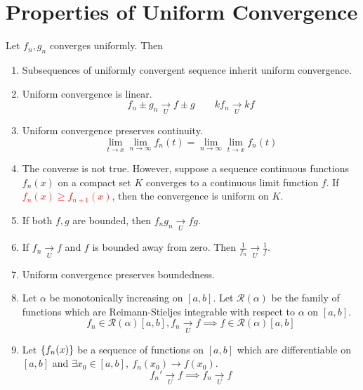 \section{Properties of Uniform Convergence}
		Let $f_n,g_n$ converges uniformly. Then
\begin{enumerate}
	\item Subsequences of uniformly convergent sequence inherit uniform convergence.
	\item Uniform convergence is linear.
	$$f_n \pm g_n \underset{U}\to f \pm g \qquad kf_n \underset{U}{\to} kf$$
	\item Uniform convergence preserves continuity.
	$$\lim_{t \to x} \lim_{n \to \infty} f_n(t) = \lim_{n \to \infty} \lim_{t \to x} f_n(t)$$
\item The converse is not true. However, suppose a sequence continuous functions $f_n(x)$ on a compact set $K$ converges to a continuous limit function $f$. If \textcolor{red}{$f_n(x) \ge f_{n+1}(x)$}, then the convergence is uniform on $K$.%
	\item If both $f,g$ are bounded, then $f_ng_n \underset{U}{\to} fg$.
	\item If $f_n \underset{U}{\to} f$ and $f$ is bounded away from zero. Then $\frac{1}{f_n} \underset{U}{\to} \frac{1}{f}$.
	\item Uniform convergence preserves boundedness.
	\item Let $\alpha$ be monotonically increasing on $[a,b]$. Let $\mathscr{R}(\alpha)$ be the family of functions which are Reimann-Stieljes integrable with respect to $\alpha$ on $[a,b]$.
	$$f_n \in \mathscr{R}(\alpha)[a,b], f_n \underset{U}{\to} f \implies f \in \mathscr{R}(\alpha)[a,b]$$
	\item Let $\{f_n(x)\}$ be a sequence of functions on $[a,b]$ which are differentiable on $[a,b]$ and $\exists x_0 \in [a,b],\ f_n(x_0) \to f(x_0)$.
	$$f_n' \underset{U}{\to} f \implies f_n \underset{U}{\to} f$$
\end{enumerate}

